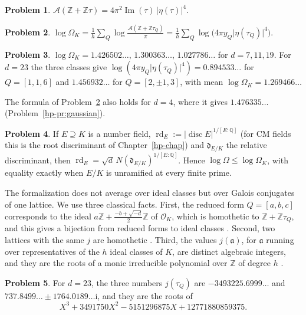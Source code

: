 \documentclass[reqno]{amsart}
\newcounter{chap}
\theoremstyle{definition}
\newtheorem{problem}{Problem}[section]
\theoremstyle{plain}
\theoremstyle{remark}
\newcommand{\Z}{\mathbb Z}
\newcommand{\Q}{\mathbb Q}
\newcommand{\Oc}{\mathcal O}
\newcommand{\Ac}{\mathcal A}
\newcommand{\aaa}{\mathfrak a}
\newcommand{\ii}{\mathrm i}
\newcommand{\rd}{\operatorname{rd}}
\begin{document}
\begin{problem}\label{pr:area-eta}
\(\Ac(\Z + \Z\tau) = 4\pi^2\operatorname{Im}(\tau)\,\lvert\eta(\tau)\rvert^4\).
\end{problem}

\begin{problem}\label{pr:class-mean}
\(\displaystyle \log\Omega_K = \frac1h\sum_Q\log\frac{\Ac(\Z + \Z\tau_Q)}{\pi} = \frac1h\sum_Q\log\bigl(4\pi y_Q\lvert\eta(\tau_Q)\rvert^4\bigr)\).
\end{problem}

\begin{problem}\label{pr:values}
\(\log\Omega_K = 1.426502\ldots\), \(1.300363\ldots\), \(1.027786\ldots\) for \(d = 7, 11, 19\).  For \(d = 23\) the three classes give \(\log(4\pi y_Q\lvert\eta(\tau_Q)\rvert^4) = 0.894533\ldots\) for \(Q = [1,1,6]\) and \(1.456932\ldots\) for \(Q = [2,\pm1,3]\), with mean \(\log\Omega_K = 1.269466\ldots\)
\end{problem}

The formula of Problem~\ref{pr:class-mean} also holds for \(d = 4\), where it gives \(1.476335\ldots\) (Problem~\ref{hp-pr:gaussian}).

\begin{problem}\label{pr:rd-E}
If \(E \supseteq K\) is a number field, \(\rd_E := \lvert\operatorname{disc}E\rvert^{1/[E:\Q]}\) (for CM fields this is the root discriminant of Chapter~\ref{hp-chap}) and \(\mathfrak d_{E/K}\) the relative discriminant, then \(\rd_E = \sqrt d\,N(\mathfrak d_{E/K})^{1/[E:\Q]}\).  Hence \(\log\Omega \le \log\Omega_K\), with equality exactly when \(E/K\) is unramified at every finite prime.
\end{problem}

The formalization does not average over ideal classes but over Galois conjugates of one lattice.  We use three classical facts.  First, the reduced form \(Q = [a, b, c]\) corresponds to the ideal \(a\Z + \frac{-b + \sqrt{-d}}{2}\Z\) of \(\Oc_K\), which is homothetic to \(\Z + \Z\tau_Q\), and this gives a bijection from reduced forms to ideal classes \cite[Thm.~7.7]{Co}.  Second, two lattices with the same \(j\) are homothetic \cite[Ch.~VI]{Si1}.  Third, the values \(j(\aaa)\), for \(\aaa\) running over representatives of the \(h\) ideal classes of \(K\), are distinct algebraic integers, and they are the roots of a monic irreducible polynomial over \(\Z\) of degree \(h\) \cite[Ch.~II]{Si2}.

\begin{problem}\label{pr:hilbert23}
For \(d = 23\), the three numbers \(j(\tau_Q)\) are \(-3493225.6999\ldots\) and \(737.8499\ldots \pm 1764.0189\ldots\ii\), and they are the roots of
\[
  X^3 + 3491750X^2 - 5151296875X + 12771880859375 .
\]
\end{problem}
\end{document}
